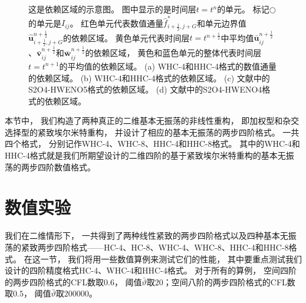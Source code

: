 \begin{figure}[htbp]
  \caption{这是依赖区域的示意图。
  图中显示的是时间层$t=t^n$的单元。
  标记${\bigcirc}$的单元是$I_{ij}$。
  红色单元代表数值通量$\hat f^*_{i+\frac{1}{2},j+G}$和单元边界值$\hat{\bm{u}}_{i+\frac{1}{2},j+G}^{n+\frac{1}{2}}$的依赖区域。
  黄色单元代表时间层$t=t^{n+\frac{1}{2}}$中平均值$\bar{\bm{u}}_{ij}^{n+\frac{1}{2}}$、$\bar{\bm{v}}_{ij}^{n+\frac{1}{2}}$和$\bar{\bm{w}}_{ij}^{n+\frac{1}{2}}$的依赖区域，
  黄色和蓝色单元的整体代表时间层$t=t^{n+1}$的平均值的依赖区域。
  (a) WHC-4和HHC-4格式的数值通量的依赖区域。
  (b) WHC-4和HHC-4格式的依赖区域。
  (c) 文献\cite{du2018hermite}中的S2O4-HWENO5格式的依赖区域。
  (d) 文献\cite{Qiu-Shu-2005}中的S2O4-HWENO4格式的依赖区域。
  }
  \label{fig:compactness}
\end{figure}

\vspace{\baselineskip} %
本节中，
我们构造了两种真正的二维基本无振荡的非线性重构，
即加权型和杂交选择型的紧致埃尔米特重构，
并设计了相应的基本无振荡的两步四阶格式。
一共四个格式，
分别记作WHC-4、WHC-8、HHC-4和HHC-8格式。
其中的WHC-4和HHC-4格式就是我们所期望设计的二维四阶的基于紧致埃尔米特重构的基本无振荡的两步四阶数值格式。

\section{数值实验}
\label{sec:2D-examples}

我们在二维情形下，
一共得到了两种线性紧致的两步四阶格式以及四种基本无振荡的紧致两步四阶格式——HC-4、HC-8、WHC-4、WHC-8、HHC-4和HHC-8格式。
在这一节，
我们将用一些数值算例来测试它们的性能，
其中要重点测试我们设计的四阶精度格式HC-4、WHC-4和HHC-4格式。
对于所有的算例，
空间四阶的两步四阶格式的CFL数取$0.6$，
阈值$\bar\vartheta$取$20$；空间八阶的两步四阶格式的CFL数取$0.5$，
阈值$\bar\vartheta$取$200000$。


